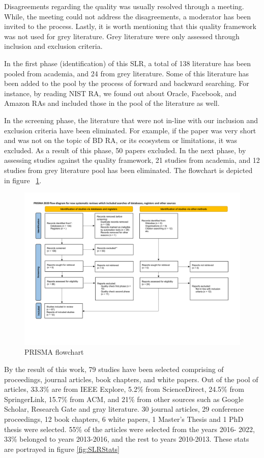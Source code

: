 \documentclass{ieeeaccess}
\begin{document}
Disagreements regarding the quality was usually resolved through a meeting. While, the meeting could not address the disagreements, a moderator has been invited to the process. Lastly, it is worth mentioning that this quality framework was not used for grey literature. Grey literature were only assessed through inclusion and exclusion criteria. 

In the first phase (identification) of this SLR, a total of 138 literature has been pooled from academia, and 24 from grey literature. Some of this literature has been added to the pool by the process of forward and backward searching. For instance, by reading NIST RA, we found out about Oracle, Facebook, and Amazon RAs and included those in the pool of the literature as well. 

In the screening phase, the literature that were not in-line with our inclusion and exclusion criteria have been eliminated. For example, if the paper was very short and was not on the topic of BD RA, or its ecosystem or limitations, it was excluded. As a result of this phase, 50 papers excluded. In the next phase, by assessing studies against the quality framework, 21 studies from academia, and 12 studies from grey literature pool has been eliminated. The flowchart is depicted in figure ~\ref{fig:PRISMA}.


\begin{figure}[t]
    \includegraphics[width=18cm]{PRISMA/PRISMA_Flow_Diagram-2.pdf}
    \caption{PRISMA flowchart}
    \label{fig:PRISMA}
\end{figure}


By the result of this work, 79 studies have been selected comprising of proceedings, journal articles, book chapters, and white papers. Out of the pool of articles, 33.3\% are from IEEE Explore, 5.2\% from ScienceDirect, 24.5\% from SpringerLink, 15.7\% from ACM, and 21\% from other sources such as Google Scholar, Research Gate and gray literature. 30 journal articles, 29 conference proceedings, 12 book chapters, 6 white papers, 1 Master’s Thesis and 1 PhD thesis were selected. 55\% of the articles were selected from the years 2016- 2022, 33\% belonged to years 2013-2016, and the rest to years 2010-2013. These stats are portrayed in figure \ref{fig:SLRStats}
\end{document}
